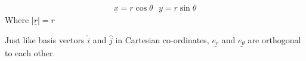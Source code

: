 \begin{definition}
	\begin{align*}
		\underline{x} = r \cos \theta  \ \ \ y =  r \sin \theta
	\end{align*}
	Where $\mid \underline{r} \mid = r$
\end{definition}

\begin{note}
	Just like basis vectors $\hat{i}$ and $\hat{j}$ in Cartesian co-ordinates, $\underline{e_{r}}$ and $\underline{e_{\theta}}$ are orthogonal to each other.
\end{note}


